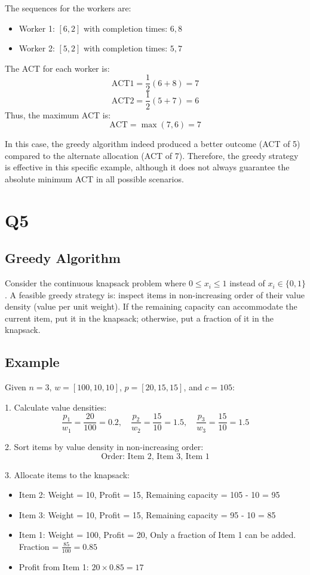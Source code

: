 \documentclass{article}
\begin{document}
The sequences for the workers are:
\begin{itemize}
    \item Worker 1: \( [6, 2] \) with completion times: \( 6, 8 \)
    \item Worker 2: \( [5, 2] \) with completion times: \( 5, 7 \)
\end{itemize}

The ACT for each worker is:
\[
\text{ACT1} = \frac{1}{2} (6 + 8) = 7
\]
\[
\text{ACT2} = \frac{1}{2} (5 + 7) = 6
\]
Thus, the maximum ACT is:
\[
\text{ACT} = \max(7, 6) = 7
\]

In this case, the greedy algorithm indeed produced a better outcome (ACT of 5) compared to the alternate allocation (ACT of 7). Therefore, the greedy strategy is effective in this specific example, although it does not always guarantee the absolute minimum ACT in all possible scenarios.


\section{Q5}
\subsection*{Greedy Algorithm}
Consider the continuous knapsack problem where \( 0 \leq x_i \leq 1 \) instead of \( x_i \in \{0, 1\} \). A feasible greedy strategy is: inspect items in non-increasing order of their value density (value per unit weight). If the remaining capacity can accommodate the current item, put it in the knapsack; otherwise, put a fraction of it in the knapsack.

\subsection*{Example}
Given \( n = 3 \), \( w = [100, 10, 10] \), \( p = [20, 15, 15] \), and \( c = 105 \):

1. Calculate value densities:
\[
\frac{p_1}{w_1} = \frac{20}{100} = 0.2, \quad \frac{p_2}{w_2} = \frac{15}{10} = 1.5, \quad \frac{p_3}{w_3} = \frac{15}{10} = 1.5
\]

2. Sort items by value density in non-increasing order:
\[
\text{Order: Item 2, Item 3, Item 1}
\]

3. Allocate items to the knapsack:
\begin{itemize}
    \item Item 2: Weight = 10, Profit = 15, Remaining capacity = 105 - 10 = 95
    \item Item 3: Weight = 10, Profit = 15, Remaining capacity = 95 - 10 = 85
    \item Item 1: Weight = 100, Profit = 20, Only a fraction of Item 1 can be added. Fraction = \(\frac{85}{100} = 0.85\)
    \item Profit from Item 1: \( 20 \times 0.85 = 17 \)
\end{itemize}
\end{document}
